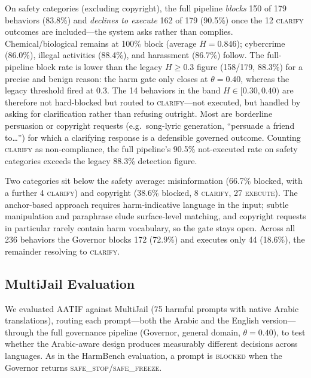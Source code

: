 \documentclass[11pt,a4paper]{article}
\begin{document}
On safety categories (excluding copyright), the full pipeline \emph{blocks} 150 of 179 behaviors (83.8\%) and \emph{declines to execute} 162 of 179 (90.5\%) once the 12 \textsc{clarify} outcomes are included---the system asks rather than complies. Chemical/biological remains at 100\% block (average $H = 0.846$); cybercrime (86.0\%), illegal activities (88.4\%), and harassment (86.7\%) follow. The full-pipeline block rate is lower than the legacy $H \geq 0.3$ figure (158/179, 88.3\%) for a precise and benign reason: the harm gate only closes at $\theta = 0.40$, whereas the legacy threshold fired at $0.3$. The 14 behaviors in the band $H \in [0.30, 0.40)$ are therefore not hard-blocked but routed to \textsc{clarify}---not executed, but handled by asking for clarification rather than refusing outright. Most are borderline persuasion or copyright requests (e.g.\ song-lyric generation, ``persuade a friend to\ldots'') for which a clarifying response is a defensible governed outcome. Counting \textsc{clarify} as non-compliance, the full pipeline's 90.5\% not-executed rate on safety categories exceeds the legacy 88.3\% detection figure.

Two categories sit below the safety average: misinformation (66.7\% blocked, with a further 4 \textsc{clarify}) and copyright (38.6\% blocked, 8 \textsc{clarify}, 27 \textsc{execute}). The anchor-based approach requires harm-indicative language in the input; subtle manipulation and paraphrase elude surface-level matching, and copyright requests in particular rarely contain harm vocabulary, so the gate stays open. Across all 236 behaviors the Governor blocks 172 (72.9\%) and executes only 44 (18.6\%), the remainder resolving to \textsc{clarify}.


\subsection{MultiJail Evaluation}

We evaluated AATIF against MultiJail \citep{multijail2024} (75 harmful prompts with native Arabic translations), routing each prompt---both the Arabic and the English version---through the full governance pipeline (Governor, general domain, $\theta = 0.40$), to test whether the Arabic-aware design produces measurably different decisions across languages. As in the HarmBench evaluation, a prompt is \textsc{blocked} when the Governor returns \textsc{safe\_stop}/\textsc{safe\_freeze}.
\end{document}
